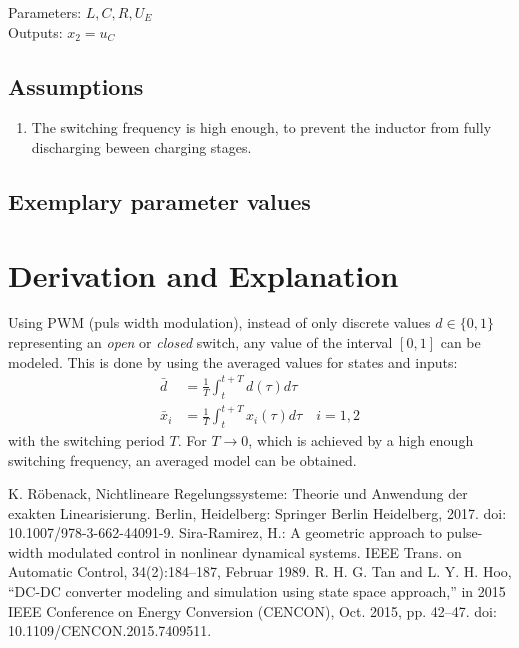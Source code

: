 \documentclass[10pt,a4paper]{article}
\begin{document}
	\noindent
	Parameters: $L, C, R, U_E$ %
	\\
	Outputs: $x_2 = u_C$
	
	
	\subsection{Assumptions} %
		\begin{enumerate} %
			\item The switching frequency is high enough, to prevent the inductor from fully discharging beween charging stages.
		\end{enumerate}
	
	
	\subsection{Exemplary parameter values}
	

	
	\section{Derivation and Explanation} %
	Using PWM (puls width modulation), instead of only discrete values $d\in\{0,1\}$ representing an \textit{open} or \textit{closed} switch, 
	any value of the interval $[0,1]$ can be modeled. This is done by using the averaged values for states and inputs:
	\begin{align*}
		\bar{d} &= \frac{1}{T}\int_t^{t+T} d(\tau)d\tau \\
		\bar{x}_i &= \frac{1}{T}\int_t^{t+T} x_i(\tau)d\tau \quad i=1,2
	\end{align*}
	with the switching period $T$. For $T\rightarrow 0$, which is achieved by a high enough switching frequency, an averaged model can be obtained.
	
	
	\begin{thebibliography}{10}		
		K. Röbenack, Nichtlineare Regelungssysteme: Theorie und Anwendung der exakten Linearisierung. Berlin, Heidelberg: Springer Berlin Heidelberg, 2017. doi: 10.1007/978-3-662-44091-9.
		Sira-Ramirez, H.: A geometric approach to pulse-width modulated control in nonlinear dynamical systems. IEEE Trans. on Automatic Control, 34(2):184–187, Februar 1989.
		R. H. G. Tan and L. Y. H. Hoo, “DC-DC converter modeling and simulation using state space approach,” in 2015 IEEE Conference on Energy Conversion (CENCON), Oct. 2015, pp. 42–47. doi: 10.1109/CENCON.2015.7409511.
	\end{thebibliography}
\end{document}
